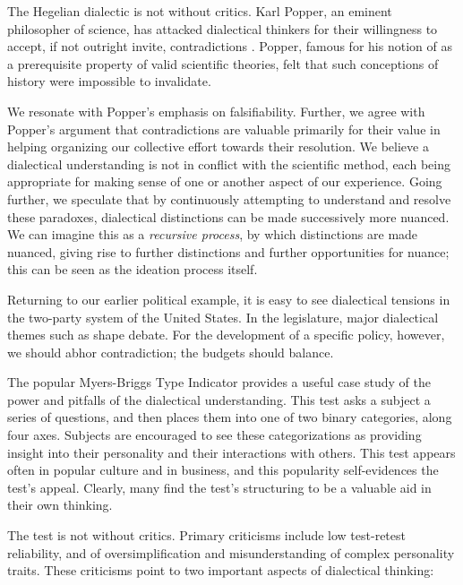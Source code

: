 The Hegelian dialectic is not without critics.
Karl Popper, an eminent philosopher of science, has attacked dialectical thinkers for their willingness to accept, if not outright invite, contradictions \citep{popper}.
Popper, famous for his notion of  as a prerequisite property of valid scientific theories, felt that such conceptions of history were impossible to invalidate.

We resonate with Popper's emphasis on falsifiability.
Further, we agree with Popper's argument that contradictions are valuable primarily for their value in helping organizing our collective effort towards their resolution.
We believe a dialectical understanding is not in conflict with the scientific method, each being appropriate for making sense of one or another aspect of our experience.
Going further, we speculate that by continuously attempting to understand and resolve these paradoxes, dialectical distinctions can be made successively more nuanced.
We can imagine this as a \textit{recursive process}, by which distinctions are made nuanced, giving rise to further distinctions and further opportunities for nuance; this can be seen as the ideation process itself.

\bigskip

Returning to our earlier political example, it is easy to see dialectical tensions in the two-party system of the United States.
In the legislature, major dialectical themes such as  shape debate.
For the development of a specific policy, however, we should abhor contradiction; the budgets should balance.

\bigskip

The popular Myers-Briggs Type Indicator provides a useful case study of the power and pitfalls of the dialectical understanding.
This test asks a subject a series of questions, and then places them into one of two binary categories, along four axes.
Subjects are encouraged to see these categorizations as providing insight into their personality and their interactions with others.
This test appears often in popular culture and in business, and this popularity self-evidences the test's appeal.
Clearly, many find the test's structuring to be a valuable aid in their own thinking.

The test is not without critics.
Primary criticisms include low test-retest reliability, and of oversimplification and misunderstanding of complex personality traits.
These criticisms point to two important aspects of dialectical thinking:

